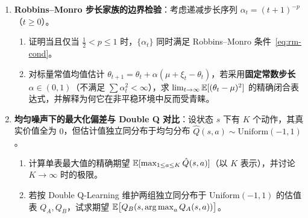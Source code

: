 
\begin{enumerate}
  \item[\textbf{6.1.3}] \textbf{Robbins--Monro 步长家族的边界检验}：考虑递减步长序列 $\alpha_t = (t + 1)^{-p}$（$t \ge 0$）。
  \begin{enumerate}
    \item 证明当且仅当 $\frac{1}{2} < p \le 1$ 时，$\{\alpha_t\}$ 同时满足 Robbins--Monro 条件~\eqref{eq:rm-cond}。
    \item 对标量常值均值估计 $\theta_{t+1} = \theta_t + \alpha(\mu + \xi_t - \theta_t)$，若采用\textbf{固定常数步长} $\alpha \in (0, 1)$（不满足 $\sum \alpha_t^2 < \infty$），求 $\lim_{t \to \infty} \mathbb{E}[(\theta_t - \mu)^2]$ 的精确闭合表达式，并解释为何它在非平稳环境中反而受青睐。
  \end{enumerate}

  \item[\textbf{6.1.4}] \textbf{均匀噪声下的最大化偏差与 Double Q 对比}：设状态 $s$ 下有 $K$ 个动作，其真实价值全为 $0$，但估计值独立同分布于均匀分布 $\hat{Q}(s, a) \sim \mathrm{Uniform}(-1, 1)$。
  \begin{enumerate}
    \item 计算单表最大值的精确期望 $\mathbb{E}[\max_{1 \le a \le K} \hat{Q}(s, a)]$（以 $K$ 表示），并讨论 $K \to \infty$ 时的极限。
    \item 若按 Double Q-Learning 维护两组独立同分布于 $\mathrm{Uniform}(-1, 1)$ 的估值表 $Q_A, Q_B$，试求期望 $\mathbb{E}\big[Q_B(s, \operatorname*{arg\,max}_a Q_A(s, a))\big]$。
  \end{enumerate}
\end{enumerate}


